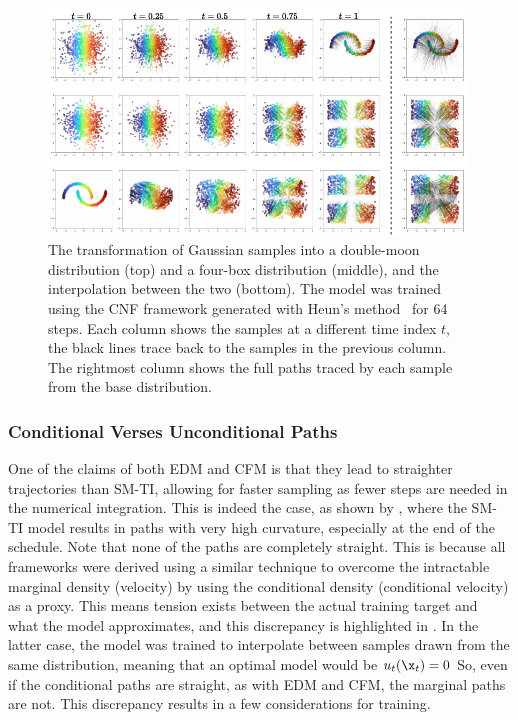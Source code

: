 \begin{figure}[ht]
    \centering
    \includegraphics[width=0.99\textwidth]{Figures/generative_models/cm_samples.pdf}
    \caption{The transformation of Gaussian samples into a double-moon distribution (top) and a four-box distribution (middle), and the interpolation between the two (bottom). The model was trained using the CNF framework generated with Heun's method~\cite{heun} for 64 steps. Each column shows the samples at a different time index $t$, the black lines trace back to the samples in the previous column. The rightmost column shows the full paths traced by each sample from the base distribution.}
    \label{fig:cm_samples}
\end{figure}


\subsubsection{Conditional Verses Unconditional Paths}

One of the claims of both EDM and CFM is that they lead to straighter trajectories than SM-TI, allowing for faster sampling as fewer steps are needed in the numerical integration.
This is indeed the case, as shown by , where the SM-TI model results in paths with very high curvature, especially at the end of the schedule.
Note that none of the paths are completely straight.
This is because all frameworks were derived using a similar technique to overcome the intractable marginal density (velocity) by using the conditional density (conditional velocity) as a proxy.
This means tension exists between the actual training target and what the model approximates, and this discrepancy is highlighted in .
In the latter case, the model was trained to interpolate between samples drawn from the same distribution, meaning that an optimal model would be $u_t(\x_t) = 0$
So, even if the conditional paths are straight, as with EDM and CFM, the marginal paths are not.
This discrepancy results in a few considerations for training.

